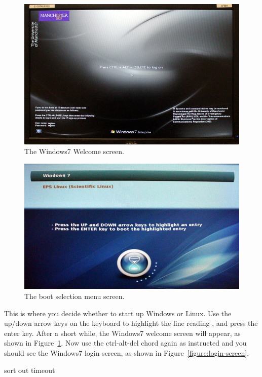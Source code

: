 \begin{figure}
\centerline{\includegraphics[width=15cm]{images/TH-win-welcome}}
\caption{The Windows7 Welcome screen.}
\label{figure:welc-screen}
\end{figure}

\begin{figure}
\centerline{\includegraphics[width=15cm]{images/TH-grub-win}}
\caption{The boot selection menu screen.}
\label{figure:welc-grub}
\end{figure}

This is where you decide whether to start up Windows or Linux. Use the
up/down arrow keys on the keyboard to highlight the line
reading , and press the enter key. After a short while, the Windows7
welcome screen will appear, as shown in Figure~\ref{figure:welc-screen}. Now use the ctrl-alt-del chord again as instructed and you should see the Windows7 login screen, as shown in Figure~\ref{figure:login-screen}.

\begin{note}
sort out timeout
\end{note}

